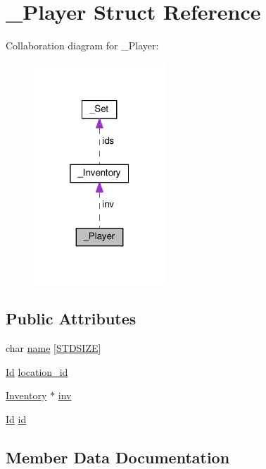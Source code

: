 \hypertarget{struct__Player}{}\section{\+\_\+\+Player Struct Reference}
\label{struct__Player}


Collaboration diagram for \+\_\+\+Player\+:\nopagebreak
\begin{figure}[H]
\begin{center}
\leavevmode
\includegraphics[width=140pt]{struct__Player__coll__graph}
\end{center}
\end{figure}
\subsection*{Public Attributes}
\begin{DoxyCompactItemize}
\item 
char \hyperlink{struct__Player_abd3fbad9568ff1e608654d58e71b8c58}{name} \mbox{[}\hyperlink{types_8h_a431b1676533a0e1714aff7d6a5542406}{S\+T\+D\+S\+I\+ZE}\mbox{]}
\item 
\hyperlink{types_8h_a845e604fb28f7e3d97549da3448149d3}{Id} \hyperlink{struct__Player_aca2cb83e7a18dea36c33ad94e36a1e54}{location\+\_\+id}
\item 
\hyperlink{inventory_8h_a2253bf64ac4ce6a9c1d6f39c0b0d32a3}{Inventory} $\ast$ \hyperlink{struct__Player_aaaeeb03326c37ce62c333c2b94fde23c}{inv}
\item 
\hyperlink{types_8h_a845e604fb28f7e3d97549da3448149d3}{Id} \hyperlink{struct__Player_a60d635cd063816a9c1bd873f4868bb90}{id}
\end{DoxyCompactItemize}


\subsection{Member Data Documentation}
